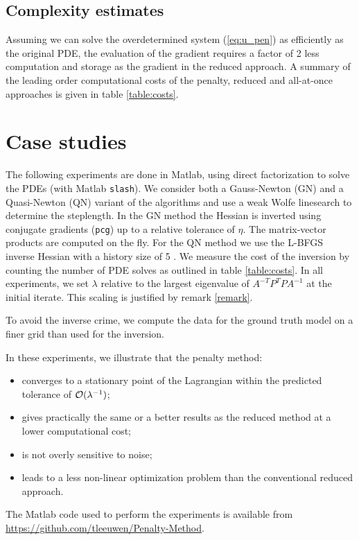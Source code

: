 \documentclass{iopart}
\begin{document}
\subsection{Complexity estimates}
Assuming we can solve the overdetermined system (\ref{eq:u_pen}) as efficiently as
the original PDE, the evaluation of the gradient requires a factor of 2 less
computation and storage as the gradient in the reduced approach. 
A summary of the leading order computational costs of the penalty, reduced and all-at-once approaches is given in table \ref{table:costs}.

\section{Case studies}
\label{examples}
The following experiments are done in Matlab, using direct factorization to solve the PDEs (with Matlab \texttt{slash}). We consider both a Gauss-Newton (GN) and a Quasi-Newton (QN) variant of the algorithms and use a weak Wolfe linesearch to determine the steplength. In the GN method the Hessian is inverted using conjugate gradients (\texttt{pcg}) up to a relative tolerance of $\eta$. The matrix-vector products are computed on the fly. For the QN method we use the L-BFGS inverse Hessian with a history size of 5 \cite{Nocedal}. We measure the cost of the inversion by counting the number of PDE solves as outlined in table \ref{table:costs}. In all experiments, we set $\lambda$ relative to the largest eigenvalue of $A^{-T}P^T\!PA^{-1}$ at the initial iterate. This scaling is justified by remark \ref{remark}.

To avoid the inverse crime, we compute the data for the ground truth model on a finer grid than used for the inversion. 

In these experiments, we illustrate that the penalty method: 
\begin{itemize}
\item converges to a stationary point of the Lagrangian within the predicted tolerance of $\mathcal{O}(\lambda^{-1})$;
\item gives practically the same or a better results as the reduced method at a lower computational cost;
\item is not overly sensitive to noise;
\item leads to a less non-linear optimization problem than the conventional reduced approach.
\end{itemize}
The Matlab code used to perform the experiments is available from \url{https://github.com/tleeuwen/Penalty-Method}.
\end{document}
